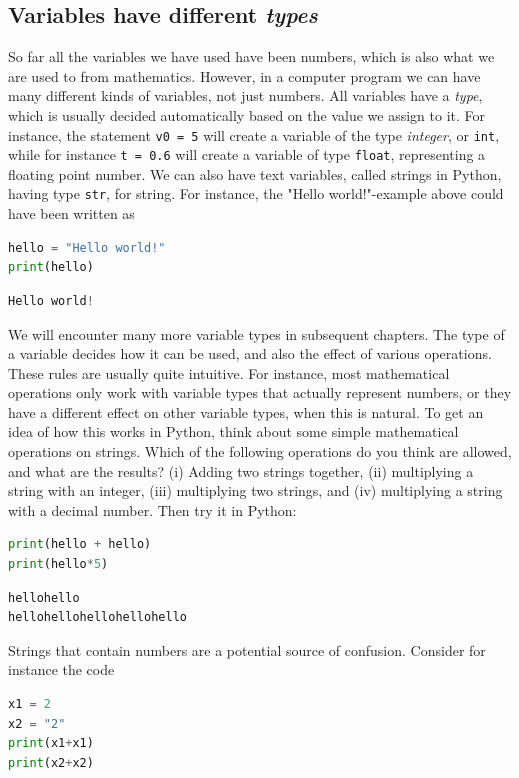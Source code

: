 \documentclass[graybox,envcountchap,sectrefs,final]{svmonodo}
\begin{document}
\subsection{Variables have different \emph{types}}

So far all the variables we have used have been numbers, which is also what we are used to from mathematics. However, in
a computer program we can have many different kinds of variables, not just numbers. All variables have a \emph{type}, which is
usually decided automatically based on the value we assign to it. For instance, the statement \texttt{v0 = 5} will create
a variable of the type \emph{integer}, or \texttt{int}, while for instance \texttt{t = 0.6} will create a variable of type \texttt{float}, representing
a floating point number. We can also have text variables, called strings in Python, having type \texttt{str},
for string. For instance, the "Hello world!"-example above could have been written as
\begin{lstlisting}[language=Python,style=blue1]
hello = "Hello world!"
print(hello)
\end{lstlisting}
\begin{lstlisting}[language=Python,style=gray]
Hello world!
\end{lstlisting}
We will encounter many more variable types in subsequent chapters. The type of a variable
decides how it can be used, and also the effect of various operations. These rules are usually
quite intuitive. For instance, most mathematical operations only work with variable types that actually represent numbers,
or they have a different effect on other variable types, when this is natural.
To get an idea of how this works in Python, think about some simple mathematical operations on strings. Which of the following operations
do you think are allowed, and what are the results? (i) Adding two strings together, (ii) multiplying a string with an integer,
(iii) multiplying two strings, and (iv) multiplying a string with a decimal number. Then try it in Python:
\begin{lstlisting}[language=Python,style=blue1]
print(hello + hello)
print(hello*5)
\end{lstlisting}
\begin{lstlisting}[language=Python,style=gray]
hellohello
hellohellohellohellohello
\end{lstlisting}
Strings that contain numbers are a potential source of confusion. Consider for instance the code
\begin{lstlisting}[language=Python,style=blue1]
x1 = 2
x2 = "2"
print(x1+x1)
print(x2+x2)
\end{lstlisting}
\end{document}
